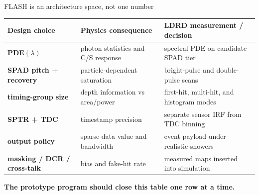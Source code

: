 \documentclass[10pt,aspectratio=169,t]{beamer}
\newcommand{\red}[1]{\textcolor{TTURed}{\bfseries #1}}
\begin{document}
\begin{frame}{FLASH is an architecture space, not one number}
  \small
  \begin{tabularx}{\textwidth}{>{\bfseries}l >{\raggedright\arraybackslash}X >{\raggedright\arraybackslash}X}
    \toprule
    Design choice & Physics consequence & LDRD measurement / decision \\
    \midrule
    PDE$(\lambda)$ & photon statistics and C/S response & spectral PDE on candidate SPAD tier \\
    SPAD pitch + recovery & particle-dependent saturation & bright-pulse and double-pulse scans \\
    timing-group size & depth information vs area/power & first-hit, multi-hit, and histogram modes \\
    SPTR + TDC & timestamp precision & separate sensor IRF from TDC binning \\
    output policy & sparse-data value and bandwidth & event payload under realistic showers \\
    masking / DCR / cross-talk & bias and fake-hit rate & measured maps inserted into simulation \\
    \bottomrule
  \end{tabularx}
  \vspace{0.30cm}
  \centering\red{The prototype program should close this table one row at a time.}
\end{frame}
\end{document}

